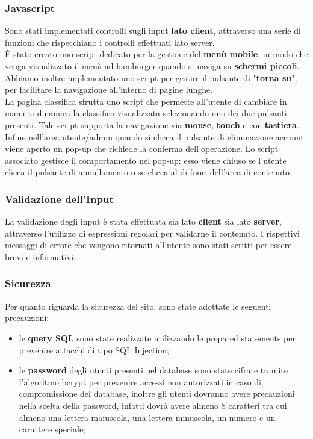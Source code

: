\documentclass[11pt,a4paper]{article}
\begin{document}
\subsubsection{Javascript}
Sono stati implementati controlli sugli input \textbf{lato client}, attraverso una serie di funzioni che rispecchiano i controlli effettuati lato server.
\\
È stato creato uno script dedicato per la gestione del \textbf{menù mobile}, in modo che venga visualizzato il menù ad hamburger quando si naviga su \textbf{schermi piccoli}. Abbiamo inoltre implementato uno script per gestire il pulsante di "\textbf{torna su}", per facilitare la navigazione all'interno di pagine lunghe.
\\
La pagina classifica sfrutta uno script che permette all'utente di cambiare in maniera dinamica la classifica visualizzata selezionando uno dei due pulsanti presenti. Tale script supporta la navigazione via \textbf{mouse}, \textbf{touch} e con \textbf{tastiera}.
\\
Infine nell'area utente/admin quando si clicca il pulsante di eliminazione account viene aperto un pop-up che richiede la conferma dell'operazione. Lo script associato gestisce il comportamento nel pop-up: esso viene chiuso se l'utente clicca il pulsante di annullamento o se clicca al di fuori dell'area di contenuto.
\subsubsection{Validazione dell'Input}
La validazione degli input è stata effettuata sia lato \textbf{client} sia lato \textbf{server}, attraverso l'utilizzo di espressioni regolari per validarne il contenuto. I rispettivi messaggi di errore che vengono ritornati all'utente sono stati scritti per essere brevi e informativi. 
\subsubsection{Sicurezza}
Per quanto riguarda la sicurezza del sito, sono state adottate le seguenti precauzioni:
\begin{itemize}
    \item le \textbf{query SQL} sono state realizzate utilizzando le prepared statements per prevenire attacchi di tipo SQL Injection;
    \item le \textbf{password} degli utenti presenti nel database sono state cifrate tramite l'algoritmo bcrypt per prevenire accessi non autorizzati in caso di compromissione del database, inoltre gli utenti dovranno avere precauzioni nella scelta della password, infatti dovrà avere almeno 8 caratteri tra cui almeno una lettera maiuscola, una lettera minuscola, un numero e un carattere speciale;
\end{itemize}
\end{document}
